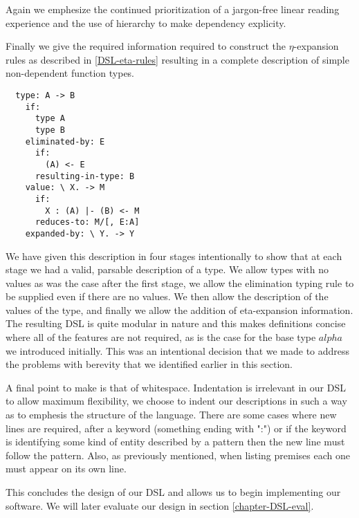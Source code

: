 Again we emphesize the continued prioritization of a jargon-free linear
reading experience and the use of hierarchy to make dependency explicity.

Finally we give the required information required to construct the
$\eta$-expansion rules as described in \ref{DSL-eta-rules} resulting in
a complete description of simple non-dependent function types.

\begin{BVerbatim}
  type: A -> B
    if:
      type A
      type B
    eliminated-by: E
      if:
        (A) <- E
      resulting-in-type: B
    value: \ X. -> M
      if:
        X : (A) |- (B) <- M
      reduces-to: M/[, E:A]
    expanded-by: \ Y. -> Y
\end{BVerbatim}

We have given this description in four stages intentionally to show
that at each stage we had a valid, parsable description of a type. We
allow types with no values as was the case after the first stage, we
allow the elimination typing rule to be supplied even if there are no
values. We then allow the description of the values of the type, and
finally we allow the addition of eta-expansion information. The
resulting DSL is quite modular in nature and this makes definitions
concise where all of the features are not required, as is the case for
the base type $alpha$ we introduced initially. This was an intentional
decision that we made to address the problems with berevity that we
identified earlier in this section.

A final point to make is that of whitespace. Indentation is irrelevant
in our DSL to allow maximum flexibility, we choose to indent
our descriptions in such a way as to emphesis the structure of the
language. There are some cases where new lines are required, after a
keyword (something ending with ":") or if the keyword is identifying
some kind of entity described by a pattern then the new line must
follow the pattern. Also, as previously mentioned, when listing
premises each one must appear on its own line.

This concludes the design of our DSL and allows us to begin
implementing our software. We will later evaluate our design in
section \ref{chapter-DSL-eval}.

